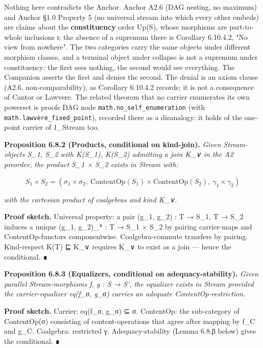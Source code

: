 \documentclass[11pt, openany]{book}
\begin{document}
Nothing here contradicts the Anchor. Anchor A2.6 (DAG nesting, no maximum) and Anchor §1.0 Property 5 (no universal stream into which every other embeds) are claims about the \textbf{constituency} order Up(S), whose morphisms are part-to-whole inclusions ι; the absence of a supremum there is Corollary 6.10.4.2, "No view from nowhere". The two categories carry the same objects under different morphism classes, and a terminal object under collapse is not a supremum under constituency: the first sees nothing, the second would see everything. The Companion asserts the first and denies the second. The denial is an axiom clause (A2.6, non-comparability), as Corollary 6.10.4.2 records; it is not a consequence of Cantor or Lawvere. The related theorem that no carrier enumerates its own powerset is proofs DAG node \texttt{math.no\_self\_enumeration} (with \texttt{math.lawvere\_fixed\_point}), recorded there as a disanalogy: it holds of the one-point carrier of 1\_\allowbreak{}Stream too.

\textbf{Proposition 6.8.2 (Products, conditional on kind-join).} \textit{Given Stream-objects S\_\allowbreak{}1, S\_\allowbreak{}2 with K(S\_\allowbreak{}1), K(S\_\allowbreak{}2) admitting a join K\_\allowbreak{}∨ in the A2 preorder, the product S\_\allowbreak{}1 × S\_\allowbreak{}2 exists in Stream with:}

\[
S_1 \times S_2 = (\sigma_1 \times \sigma_2,\ \mathrm{ContentOp}(S_1) \times \mathrm{ContentOp}(S_2),\ \gamma_1 \times \gamma_2)
\]

\textit{with the cartesian product of coalgebras and kind K\_\allowbreak{}∨.}

\textbf{Proof sketch.} Universal property: a pair (g\_\allowbreak{}1, g\_\allowbreak{}2) : T → S\_\allowbreak{}1, T → S\_\allowbreak{}2 induces a unique (g\_\allowbreak{}1, g\_\allowbreak{}2)\_\allowbreak{}* : T → S\_\allowbreak{}1 × S\_\allowbreak{}2 by pairing carrier-maps and ContentOp-functors componentwise. Coalgebra-commute transfers by pairing. Kind-respect K(T) ⊑ K\_\allowbreak{}∨ requires K\_\allowbreak{}∨ to exist as a join --- hence the conditional. ∎

\textbf{Proposition 6.8.3 (Equalizers, conditional on adequacy-stability).} \textit{Given parallel Stream-morphisms f, g : S → S', the equalizer exists in Stream provided the carrier-equalizer eq(f\_\allowbreak{}σ, g\_\allowbreak{}σ) carries an adequate ContentOp-restriction.}

\textbf{Proof sketch.} Carrier: eq(f\_\allowbreak{}σ, g\_\allowbreak{}σ) ⊆ σ. ContentOp: the sub-category of ContentOp(σ) consisting of content-operations that agree after mapping by f\_\allowbreak{}C and g\_\allowbreak{}C. Coalgebra: restricted γ. Adequacy-stability (Lemma 6.8.β below) gives the conditional. ∎
\end{document}
